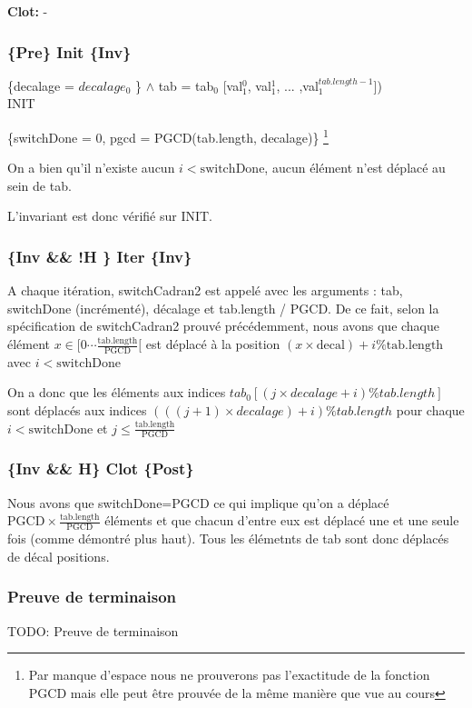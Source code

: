 \noindent \textbf{Clot: } -

\subsubsection*{\{Pre\} Init \{Inv\}}

\{decalage = $decalage_{0}$ \}
$\wedge$ tab = tab$_{0}$ [val$_{1}^{0}$, val$_{1}^{1}$, ... ,val$_{1}^{tab.length-1}$])\\

INIT

\{switchDone = 0, pgcd = PGCD(tab.length, decalage)\} \footnote{Par manque d'espace nous ne prouverons pas l'exactitude de la fonction PGCD mais elle peut être prouvée de la même manière que vue au cours}

On a bien qu'il n'existe aucun $i < \mathrm{switchDone}$, aucun élément n'est déplacé au sein de tab.

L'invariant est donc vérifié sur INIT.

\subsubsection*{\{Inv \&\& !H \} Iter \{Inv\}}

A chaque itération, switchCadran2 est appelé avec les arguments : tab,
switchDone (incrémenté), décalage et tab.length / PGCD. De ce fait,
selon la spécification de switchCadran2 prouvé précédemment, nous avons
que chaque élément $x \in [0\cdots
    \frac{\mathrm{tab.length}}{\mathrm{PGCD}}[$ est déplacé à la
        position $(x\times \mathrm{decal})+i \% \mathrm{tab.length}$ avec $i < \mathrm{switchDone}$

On a donc que les éléments aux indices $tab_{0}[(j \times decalage + i) \% tab.length]$ sont déplacés aux indices $(((j+1)\times decalage)+i) \% tab.length$ pour chaque $i < \mathrm{switchDone}$ et $j \leq \frac{\mathrm{tab.length}}{\mathrm{PGCD}}$ 

\subsubsection*{\{Inv \&\& H\} Clot \{Post\}}

 Nous avons que switchDone=PGCD ce qui implique qu'on a déplacé
$\mathrm{PGCD}\times \frac{\mathrm{tab.length}}{\mathrm{PGCD}}$ éléments et
que chacun d'entre eux est déplacé une et une seule fois (comme démontré
plus haut). Tous les élémetnts de tab sont donc déplacés de décal positions.

\subsubsection*{Preuve de terminaison}
TODO: Preuve de terminaison
